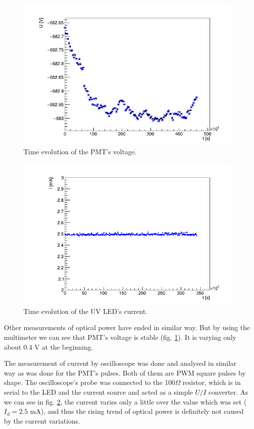 \begin{figure}[H]
 \centering
 \includegraphics[scale=0.5]{./pictures/voltage}
 \caption{Time evolution of the PMT's voltage.}
 \label{PMTVolt}
\end{figure}

\begin{figure}[H]
 \centering
 \includegraphics[scale=0.5]{./pictures/Current}
 \caption{Time evolution of the UV LED's current.}
 \label{LEDCurrent}
\end{figure}

Other measurements of optical power have ended in similar way. But by using the multimeter we can see that PMT's voltage is stable (fig. \ref{PMTVolt}). It is varying only about 0.4 V at the beginning.
\par
The measurement of current by oscilloscope was done and analysed in similar way as was done for the PMT's pulses. Both of them are PWM square pulses by shape. The oscilloscope's probe was connected to the 100$\Omega$ resistor, which is in serial to the LED and the current source and acted as a simple $U/I$ converter. As we can see in fig. \ref{LEDCurrent}, the current varies only a little over the value which was set ($I_\textrm{d} = 2.5$ mA), and thus the rising trend of optical power is definitely not caused by the current variations.


